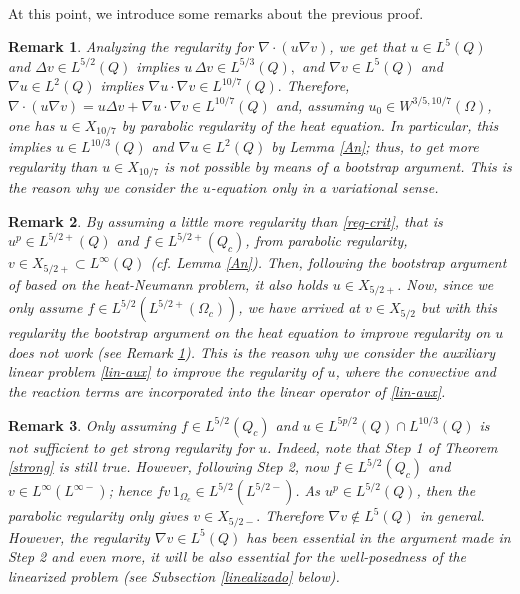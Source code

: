 \documentclass[11pt,reqno]{amsart}%
\newtheorem{remark}{Remark}[section]
\numberwithin{equation}{section}
\begin{document}
{\


At this point, we introduce some remarks about the previous proof. 

\begin{remark}\label{r:3.1}
 Analyzing %
 the regularity for $\nabla \cdot (u \nabla v)$, we get
that $u \in L^{5}(Q)$  and $\Delta v \in L^{5/2}(Q)$ implies $u \,\Delta v \in L^{5/3}(Q),$ and 
 $\nabla v \in L^5(Q)$ and $\nabla u \in L^{2}(Q)$ implies $\nabla u \cdot \nabla v \in L^{10/7}(Q).$ 
Therefore, $\nabla \cdot (u \nabla v)=u\Delta v+\nabla u\cdot\nabla v \in L^{10/7}(Q)$ and, assuming $u_0\in W^{3/5,10/7}(\Omega)$, one has $u\in X_{10/7}$ by parabolic  regularity of the heat equation.  In particular, this implies $u \in L^{10/3}(Q)$ and $\nabla u \in L^2(Q)$ by Lemma \ref{An}; thus, to get more regularity than $u\in X_{10/7}$ is not possible by means of  a bootstrap argument. This is the reason why we consider the $u$-equation only  in a variational sense.
\end{remark}

\begin{remark}
By assuming a little more regularity than \eqref{reg-crit}, that is  $u^p \in L^{5/2+}(Q)$ and $f\in L^{5/2+}(Q_c)$, from  parabolic regularity, 
$
v \in X_{5/2+}\subset L^\infty(Q)
$
(cf. Lemma \ref{An}). Then, following the bootstrap argument of \cite[Theorem 3.3]{Andre_SICOM} based on the heat-Neumann problem,  it also holds $u \in X_{5/2+}$.
Now, since we only assume $f\in L^{5/2}(L^{5/2+}(\Omega_c))$,  we have arrived at $v\in X_{5/2}$ but with this regularity the bootstrap argument on the heat equation to improve regularity on $u$ does not work (see Remark \ref{r:3.1}).  This is the reason why we consider the auxiliary linear problem \eqref{lin-aux} to improve the regularity of $u$, where the convective and the reaction terms are incorporated into the linear operator of \eqref{lin-aux}.
\end{remark}

\begin{remark} Only assuming $f\in L^{5/2}(Q_c)$ and $u \in L^{5p/2}(Q)\cap L^{10/3}(Q)$ 
is not sufficient to get strong regularity for $u$. 
Indeed, note that Step 1 of Theorem \ref{strong} is still true. However, following Step 2, now  $f\in L^{5/2}(Q_c)$ and $v \in L^{\infty}(L^{\infty-})$; hence 
$f v\,1_{\Omega_c} \in L^{5/2}(L^{5/2-})$. As $u^p \in L^{5/2}(Q)$, then the parabolic  regularity only gives
$v \in X_{5/2-}.$ Therefore $\nabla v\not\in L ^5(Q)$ in general. However, the regularity $\nabla v\in L^5(Q)$ has been essential in the  argument made in Step 2 and even more, it will be also essential for the well-posedness of the linearized problem (see Subsection \ref{linealizado} below).
\end{remark}
%
}
\end{document}
